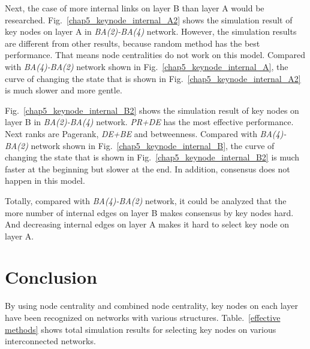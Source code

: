 Next, the case of more internal links on layer B than layer A would be researched. Fig.~\ref{chap5_keynode_internal_A2} shows the simulation result of key nodes on layer A in \textit{BA(2)-BA(4)} network. However, the simulation results are different from other results, because random method has the best performance. That means node centralities do not work on this model. Compared with \textit{BA(4)-BA(2)} network shown in Fig.~\ref{chap5_keynode_internal_A}, the curve of changing the state that is shown in Fig.~\ref{chap5_keynode_internal_A2}  is much slower and more gentle.

Fig.~\ref{chap5_keynode_internal_B2} shows the simulation result of key nodes on layer B in \textit{BA(2)-BA(4)} network. \textit{PR+DE} has the most effective performance. Next ranks are Pagerank, \textit{DE+BE} and betweenness. Compared with \textit{BA(4)-BA(2)} network shown in Fig.~\ref{chap5_keynode_internal_B}, the curve of changing the state that is shown in Fig.~\ref{chap5_keynode_internal_B2} is much faster at the beginning but slower at the end. In addition, consensus does not happen in this model.

Totally, compared with \textit{BA(4)-BA(2)} network, it could be analyzed that the more number of internal edges on layer B makes consensus by key nodes hard. And decreasing internal edges on layer A makes it hard to select key node on layer A.\\   

\section{Conclusion}
By using node centrality and combined node centrality, key nodes on each layer have been recognized on networks with various structures. Table.~\ref{effective methods} shows total simulation results for selecting key nodes on various interconnected networks.
 
